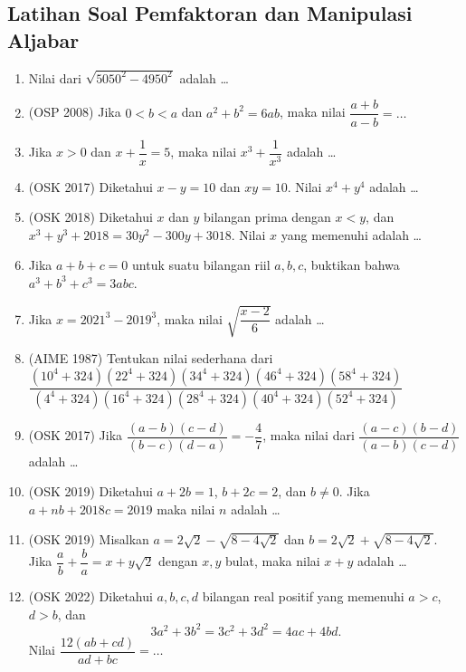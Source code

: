 \subsection{Latihan Soal Pemfaktoran dan Manipulasi Aljabar}
\begin{enumerate}
    \item  Nilai dari $\sqrt{5050^2-4950^2}$ adalah \dots

    \item (OSP 2008) Jika $0 < b < a$ dan $a^2+b^2=6ab$, maka nilai $\dfrac{a+b}{a-b}=\dots$
    
    \item Jika $x > 0$ dan $x + \dfrac{1}{x} =  5$, maka nilai $x^3+\dfrac{1}{x^3}$ adalah \dots
    
    \item (OSK 2017) Diketahui $x-y=10$ dan $xy=10$. Nilai $x^4+y^4$ adalah \dots
    
    \item (OSK 2018) Diketahui $x$ dan $y$ bilangan prima dengan $x < y$, dan $x^3+y^3+2018=30y^2-300y+3018$. Nilai $x$ yang memenuhi adalah \dots
    
    \item Jika $a+b+c=0$ untuk suatu bilangan riil $a,b,c$, buktikan bahwa $a^3+b^3+c^3=3abc$.
    
    \item Jika $x=2021^3-2019^3$, maka nilai $\sqrt{\dfrac{x-2}{6}}$ adalah \dots

    \item (AIME 1987)
    Tentukan nilai sederhana dari $\dfrac{(10^4+324)(22^4+324)(34^4+324)(46^4+324)(58^4+324)}{(4^4+324)(16^4+324)(28^4+324)(40^4+324)(52^4+324)}$

    \item (OSK 2017) Jika $\dfrac{(a-b)(c-d)}{(b-c)(d-a)}=-\dfrac{4}{7}$, maka nilai dari $\dfrac{(a-c)(b-d)}{(a-b)(c-d)}$ adalah \dots

    \item (OSK 2019) Diketahui $a+2b=1$, $b+2c=2$, dan $b \neq 0$. Jika $a+nb+2018c = 2019$ maka nilai $n$ adalah \dots

    \item (OSK 2019) Misalkan $a = 2\sqrt{2} - \sqrt{8-4\sqrt{2}}$ dan $b = 2\sqrt{2} + \sqrt{8-4\sqrt{2}}$. Jika $\dfrac{a}{b}+\dfrac{b}{a}=x+y\sqrt{2}$ dengan $x,y$ bulat, maka nilai $x+y$ adalah \dots

    \item (OSK 2022) Diketahui $a,b,c,d$ bilangan real positif yang memenuhi $a>c$, $d>b$, dan 
    $$3a^2+3b^2=3c^2+3d^2=4ac+4bd.$$
    Nilai $\dfrac{12(ab+cd)}{ad+bc}=\dots$ 
\end{enumerate}